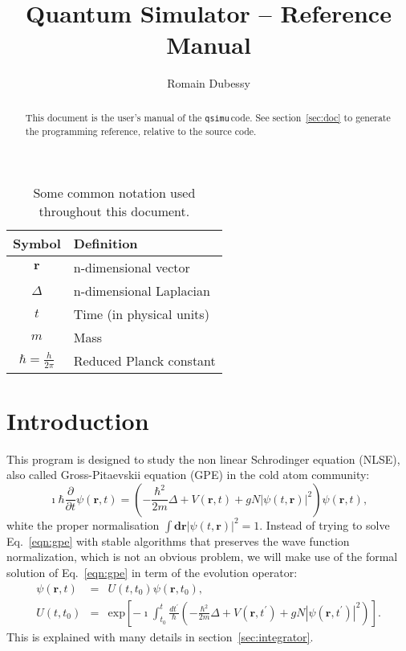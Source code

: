 \documentclass[12pt,a4paper]{report}
\author{Romain Dubessy}
\title{Quantum Simulator -- Reference Manual}
\newcommand{\abs}[1]{\left|#1\right|}
\newcommand{\qsimu}{\texttt{qsimu}\,}
\renewcommand{\exp}[1]{\textrm{exp}\left[#1\right]}
\begin{document}
\maketitle
\begin{abstract}
This document is the user's manual of the \qsimu code.
See section~\ref{sec:doc} to generate the programming reference, relative to the source code.
\end{abstract}
\begin{table}
\begin{center}
\begin{tabular}{c|l}
Symbol & Definition \\\hline
$\bm{r}$ & n-dimensional vector\\
$\Delta$ & n-dimensional Laplacian\\
$t$ & Time (in physical units)\\
$m$ & Mass\\
$\hbar=\frac{h}{2\pi}$ & Reduced Planck constant\\
\hline
\end{tabular}
\caption{\label{tab:notations}Some common notation used throughout this document.}
\end{center}
\end{table}
\cleardoublepage
\tableofcontents
\chapter{Introduction}
This program is designed to study the non linear Schrodinger equation (NLSE), also called Gross-Pitaevskii equation (GPE) in the cold atom community:
\begin{equation}
\imath\hbar\frac{\partial}{\partial t}\psi(\bm{r},t)=\left(-\frac{\hbar^2}{2m}\Delta+V(\bm{r},t)+gN\abs{\psi(t,\bm{r})}^2\right)\psi(\bm{r},t),
\label{eqn:gpe}
\end{equation}
white the proper normalisation $\int \bm{dr}\abs{\psi(t,\bm{r})}^2=1$.
Instead of trying to solve Eq.~\eqref{eqn:gpe} with stable algorithms that preserves the wave function normalization, which is not an obvious problem, we will make use of the formal solution of Eq.~\eqref{eqn:gpe} in term of the evolution operator:
\begin{subequations}
\begin{eqnarray}
\psi(\bm{r},t)&=&U(t,t_0)\psi(\bm{r},t_0),\\
U(t,t_0)&=&\exp{-\imath\int_{t_0}^t\frac{dt^\prime}{\hbar}\left(-\frac{\hbar^2}{2m}\Delta+V(\bm{r},t^\prime)+gN\abs{\psi(\bm{r},t^\prime)}^2\right)}.
\label{eqn:evolution}
\end{eqnarray}
\end{subequations}
This is explained with many details in section~\ref{sec:integrator}.
\end{document}
